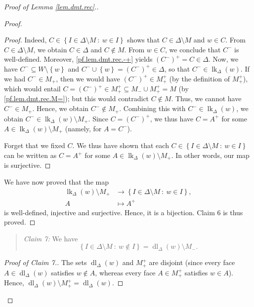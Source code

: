\documentclass[12pt]{amsart}
\theoremstyle{definition}
\newenvironment{statement}{\begin{quote}}{\end{quote}}
\DeclareMathOperator{\lk}{lk}
\DeclareMathOperator{\dl}{dl}
\begin{document}
\begin{proof}[Proof of Lemma \ref{lem.dmt.rec}.]
\begin{proof}
\begin{proof}
Indeed, $C\in\left\{  I\in\Delta\setminus M\ :\ w\in I\right\}  $ shows that
$C\in\Delta\setminus M$ and $w\in C$. From $C\in\Delta\setminus M$, we obtain
$C\in\Delta$ and $C\notin M$. From $w\in C$, we conclude that $C^-$ is
well-defined. Moreover, \eqref{pf.lem.dmt.rec.-+} yields $\left(
C^-\right)  ^+=C\in\Delta$. Now, we have $C^-\subseteq W\setminus
\left\{  w\right\}  $ and $C^-\cup\left\{  w\right\}  =\left(  C^-\right)
^+\in\Delta$, so that $C^-\in\lk_{\Delta}\left(
w\right)  $. If we had $C^-\in M_+$, then we would have $\left(
C^-\right)  ^+\in M_+^+$ (by the definition of $M_+^+$), which
would entail $C=\left(  C^-\right)  ^+\in M_+^+\subseteq M_-\cup
M_+^+=M$ (by \eqref{pf.lem.dmt.rec.M=}); but this would contradict
$C\notin M$. Thus, we cannot have $C^-\in M_+$. Hence, we obtain
$C^-\notin M_+$. Combining this with
$C^-\in\lk_{\Delta}\left(  w\right)  $, we obtain
$C^-\in\lk_{\Delta}\left(  w\right)  \setminus M_+$. Since $C=\left(
C^-\right)  ^+$, we thus have $C=A^+$ for some
$A\in\lk_{\Delta}\left(  w\right)  \setminus M_+$ (namely, for $A=C^-$).

Forget that we fixed $C$. We thus have shown that each $C\in\left\{
I\in\Delta\setminus M\ :\ w\in I\right\}  $ can be written as $C=A^+$ for
some $A\in\lk_{\Delta}\left(  w\right)  \setminus
M_+$. In other words, our map is surjective.
\end{proof}

We have now proved that the map
\begin{align*}
\lk_{\Delta}\left(  w\right)  \setminus M_+  &
\rightarrow\left\{  I\in\Delta\setminus M\ :\ w\in I\right\}  ,\\
A  &  \mapsto A^+%
\end{align*}
is well-defined, injective and surjective. Hence, it is a bijection. Claim 6
is thus proved.{}
\end{proof}

\begin{statement}
\textit{Claim 7:} We have%
\[
\left\{  I\in\Delta\setminus M\ :\ w\notin I\right\}
= \dl_{\Delta}\left(  w\right)  \setminus M_-.
\]

\end{statement}

\begin{proof}
[Proof of Claim 7.]The sets $\dl_{\Delta}\left(
w\right)  $ and $M_+^+$ are disjoint (since every face $A\in
\dl_{\Delta}\left(  w\right)  $ satisfies $w\notin A$,
whereas every face $A\in M_+^+$ satisfies $w\in A$). Hence,
$\dl_{\Delta}\left(  w\right)  \setminus M_+%
^+=\dl_{\Delta}\left(  w\right)  $.


\end{proof}
\end{proof}
\end{document}
